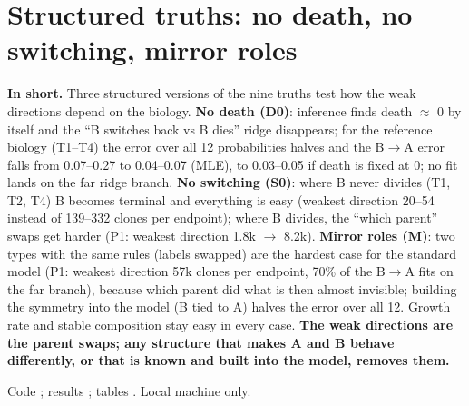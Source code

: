 \documentclass[10pt,a4paper]{article}
\newcommand{\BA}{B$\to$A}
\begin{document}
\section{Structured truths: no death, no switching, mirror roles}\label{sec:structured}
\begin{keybox}
\textbf{In short.} Three structured versions of the nine truths test how the weak directions depend on the biology. \textbf{No death (D0)}: inference finds death $\approx$ 0 by itself and the ``B switches back vs B dies'' ridge disappears; for the reference biology (T1--T4) the error over all 12 probabilities halves and the \BA{} error falls from 0.07--0.27 to 0.04--0.07 (MLE), to 0.03--0.05 if death is fixed at 0; no fit lands on the far ridge branch. \textbf{No switching (S0)}: where B never divides (T1, T2, T4) B becomes terminal and everything is easy (weakest direction 20--54 instead of 139--332 clones per endpoint); where B divides, the ``which parent'' swaps get harder (P1: weakest direction 1.8k $\to$ 8.2k). \textbf{Mirror roles (M)}: two types with the same rules (labels swapped) are the hardest case for the standard model (P1: weakest direction 57k clones per endpoint, 70\% of the \BA{} fits on the far branch), because which parent did what is then almost invisible; building the symmetry into the model (B tied to A) halves the error over all 12. Growth rate and stable composition stay easy in every case. \textbf{The weak directions are the parent swaps; any structure that makes A and B behave differently, or that is known and built into the model, removes them.}
\end{keybox}
Code ; results ; tables . Local machine only.
\end{document}
